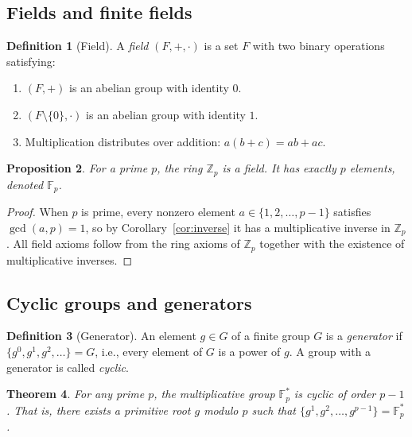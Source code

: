 \documentclass[twoside,12pt]{book}
\theoremstyle{plain}
\newtheorem{theorem}{Theorem}[chapter]
\newtheorem{proposition}[theorem]{Proposition}
\theoremstyle{definition}
\newtheorem{definition}[theorem]{Definition}
\theoremstyle{remark}
\begin{document}
\subsection{Fields and finite fields}

\begin{definition}[Field]
A \emph{field} $(F, +, \cdot)$ is a set $F$ with two binary operations satisfying:
\begin{enumerate}[nosep]
    \item $(F, +)$ is an abelian group with identity $0$.
    \item $(F \setminus \{0\}, \cdot)$ is an abelian group with identity $1$.
    \item Multiplication distributes over addition: $a(b + c) = ab + ac$.
\end{enumerate}
\end{definition}

\begin{proposition}
For a prime $p$, the ring $\mathbb{Z}_p$ is a field. It has exactly $p$ elements, denoted $\mathbb{F}_p$.
\end{proposition}

\begin{proof}
When $p$ is prime, every nonzero element $a \in \{1, 2, \ldots, p-1\}$ satisfies $\gcd(a, p) = 1$, so by Corollary~\ref{cor:inverse} it has a multiplicative inverse in $\mathbb{Z}_p$. All field axioms follow from the ring axioms of $\mathbb{Z}_p$ together with the existence of multiplicative inverses.
\end{proof}

\subsection{Cyclic groups and generators}

\begin{definition}[Generator]
An element $g \in G$ of a finite group $G$ is a \emph{generator} if $\{g^0, g^1, g^2, \ldots\} = G$, i.e., every element of $G$ is a power of $g$. A group with a generator is called \emph{cyclic}.
\end{definition}

\begin{theorem}
\label{thm:cyclic}
For any prime $p$, the multiplicative group $\mathbb{F}_p^*$ is cyclic of order $p - 1$. That is, there exists a \emph{primitive root} $g$ modulo $p$ such that $\{g^1, g^2, \ldots, g^{p-1}\} = \mathbb{F}_p^*$.
\end{theorem}
\end{document}
